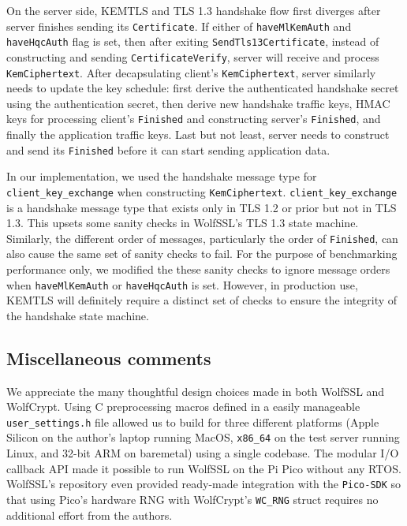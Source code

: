 \documentclass[letterpaper,12pt,titlepage,oneside,final]{book}
\begin{document}
On the server side, KEMTLS and TLS 1.3 handshake flow first diverges after server finishes sending its \texttt{Certificate}. 
If either of \texttt{haveMlKemAuth} and \texttt{haveHqcAuth} flag is set, then after exiting \texttt{SendTls13Certificate}, instead of constructing and sending \texttt{CertificateVerify}, server will receive and process \texttt{KemCiphertext}.
After decapsulating client's \texttt{KemCiphertext}, server similarly needs to update the key schedule: first derive the authenticated handshake secret using the authentication secret, then derive new handshake traffic keys, HMAC keys for processing client's \texttt{Finished} and constructing server's \texttt{Finished}, and finally the application traffic keys.
Last but not least, server needs to construct and send its \texttt{Finished} before it can start sending application data.

In our implementation, we used the handshake message type for \texttt{client\_key\_exchange} when constructing \texttt{KemCiphertext}. \texttt{client\_key\_exchange} is a handshake message type that exists only in TLS 1.2 or prior but not in TLS 1.3. 
This upsets some sanity checks in WolfSSL's TLS 1.3 state machine. Similarly, the different order of messages, particularly the order of \texttt{Finished}, can also cause the same set of sanity checks to fail. 
For the purpose of benchmarking performance only, we modified the these sanity checks to ignore message orders when \texttt{haveMlKemAuth} or \texttt{haveHqcAuth} is set.
However, in production use, KEMTLS will definitely require a distinct set of checks to ensure the integrity of the handshake state machine.

\subsection{Miscellaneous comments}
We appreciate the many thoughtful design choices made in both WolfSSL and WolfCrypt. Using C preprocessing macros defined in a easily manageable \texttt{user\_settings.h} file allowed us to build for three different platforms (Apple Silicon on the author's laptop running MacOS, \texttt{x86\_64} on the test server running Linux, and 32-bit ARM on baremetal) using a single codebase. The modular I/O callback API made it possible to run WolfSSL on the Pi Pico without any RTOS. WolfSSL's repository even provided ready-made integration with the \texttt{Pico-SDK} so that using Pico's hardware RNG with WolfCrypt's \texttt{WC\_RNG} struct requires no additional effort from the authors.
\end{document}
